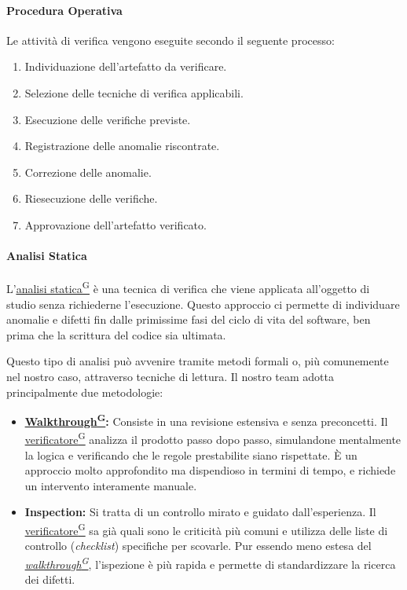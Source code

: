 \documentclass[a4paper,12pt]{article}
\providecommand{\glslink}[2]{\href{https://alittlebyte-19.github.io/Documentazione/glossario.html\#gls-#1}{\underline{#2}\textsuperscript{\scriptsize G}}}
\begin{document}
\paragraph{Procedura Operativa}
Le attività di verifica vengono eseguite secondo il seguente processo:

\begin{enumerate}
    \item Individuazione dell'artefatto da verificare.
    \item Selezione delle tecniche di verifica applicabili.
    \item Esecuzione delle verifiche previste.
    \item Registrazione delle anomalie riscontrate.
    \item Correzione delle anomalie.
    \item Riesecuzione delle verifiche.
    \item Approvazione dell'artefatto verificato.
\end{enumerate}

\paragraph{Analisi Statica}
L'\glslink{analisi-statica}{analisi statica} è una tecnica di verifica che viene applicata all'oggetto di studio senza richiederne l'esecuzione. Questo approccio ci permette di individuare anomalie e difetti fin dalle primissime fasi del ciclo di vita del software, ben prima che la scrittura del codice sia ultimata.

Questo tipo di analisi può avvenire tramite metodi formali o, più comunemente nel nostro caso, attraverso tecniche di lettura. Il nostro team adotta principalmente due metodologie:

\begin{itemize}
    \item \textbf{\glslink{walkthrough}{Walkthrough}:} Consiste in una revisione estensiva e senza preconcetti. Il \glslink{verificatore}{verificatore} analizza il prodotto passo dopo passo, simulandone mentalmente la logica e verificando che le regole prestabilite siano rispettate. È un approccio molto approfondito ma dispendioso in termini di tempo, e richiede un intervento interamente manuale.
    
    \item \textbf{Inspection:} Si tratta di un controllo mirato e guidato dall'esperienza. Il \glslink{verificatore}{verificatore} sa già quali sono le criticità più comuni e utilizza delle liste di controllo (\textit{checklist}) specifiche per scovarle. Pur essendo meno estesa del \textit{\glslink{walkthrough}{walkthrough}}, l'ispezione è più rapida e permette di standardizzare la ricerca dei difetti.
\end{itemize}
\end{document}
